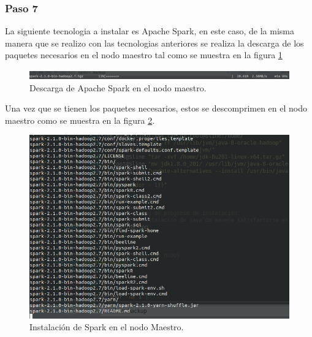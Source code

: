 \subsubsection{Paso 7}
La siguiente tecnologia a instalar es Apache Spark, en este caso, de la misma manera que se realizo con las tecnologias anteriores se realiza la descarga de los paquetes necesarios en el nodo maestro tal como se muestra en la figura \ref{fig:sparkmaestro}
\begin{figure}[H]
	\hypertarget{fig:sparkmaestro}{\hspace{1pt}}
	\begin{center}	
		\includegraphics[width=.7\textwidth]{capitulo5/images/descargasparkmaster.png}
		\caption{Descarga de Apache Spark en el nodo maestro.}
		\label{fig:sparkmaestro}
	\end{center}
\end{figure}
Una vez que se tienen los paquetes necesarios, estos se descomprimen en el nodo maestro como se muestra en la figura \ref{fig:una1}. 
\begin{figure}[H]
	\hypertarget{fig:una1}{\hspace{1pt}}
	\begin{center}	
		\includegraphics[width=.7\textwidth]{capitulo5/images/instalacionsparkmaestro.png}
		\caption{Instalación de Spark en el nodo Maestro.}
		\label{fig:una1}
	\end{center}
\end{figure}
